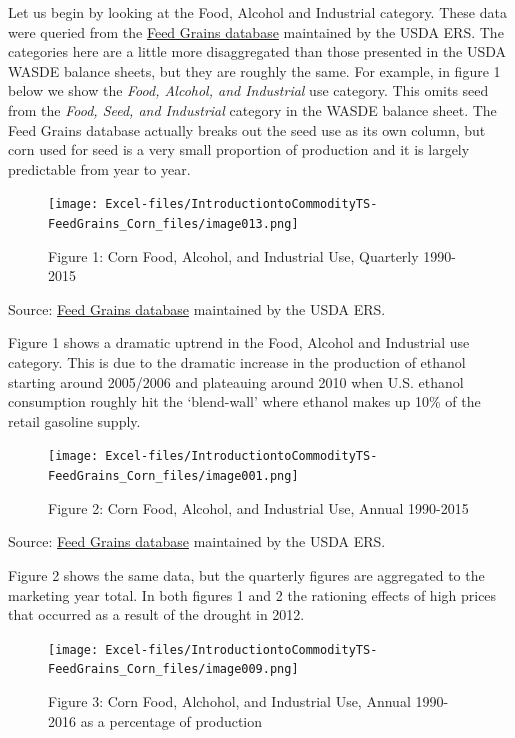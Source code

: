 \documentclass[
]{book}
\begin{document}
Let us begin by looking at the Food, Alcohol and Industrial category. These data were queried from the \href{http://www.ers.usda.gov/data-products/feed-grains-database/feed-grains-yearbook-tables.aspx\#26780}{Feed Grains database} maintained by the USDA ERS. The categories here are a little more disaggregated than those presented in the USDA WASDE balance sheets, but they are roughly the same. For example, in figure 1 below we show the \emph{Food, Alcohol, and Industrial} use category. This omits seed from the \emph{Food, Seed, and Industrial} category in the WASDE balance sheet. The Feed Grains database actually breaks out the seed use as its own column, but corn used for seed is a very small proportion of production and it is largely predictable from year to year.

\begin{figure}
\centering
\texttt{[image: Excel-files/IntroductiontoCommodityTS-FeedGrains\_Corn\_files/image013.png]}
\caption{Figure 1: Corn Food, Alcohol, and Industrial Use, Quarterly 1990-2015}
\end{figure}

Source: \href{http://www.ers.usda.gov/data-products/feed-grains-database/feed-grains-yearbook-tables.aspx\#26780}{Feed Grains database} maintained by the USDA ERS.

Figure 1 shows a dramatic uptrend in the Food, Alcohol and Industrial use category. This is due to the dramatic increase in the production of ethanol starting around 2005/2006 and plateauing around 2010 when U.S. ethanol consumption roughly hit the `blend-wall' where ethanol makes up 10\% of the retail gasoline supply.

\begin{figure}
\centering
\texttt{[image: Excel-files/IntroductiontoCommodityTS-FeedGrains\_Corn\_files/image001.png]}
\caption{Figure 2: Corn Food, Alcohol, and Industrial Use, Annual 1990-2015}
\end{figure}

Source: \href{http://www.ers.usda.gov/data-products/feed-grains-database/feed-grains-yearbook-tables.aspx\#26780}{Feed Grains database} maintained by the USDA ERS.

Figure 2 shows the same data, but the quarterly figures are aggregated to the marketing year total. In both figures 1 and 2 the rationing effects of high prices that occurred as a result of the drought in 2012.

\begin{figure}
\centering
\texttt{[image: Excel-files/IntroductiontoCommodityTS-FeedGrains\_Corn\_files/image009.png]}
\caption{Figure 3: Corn Food, Alchohol, and Industrial Use, Annual 1990-2016 as a percentage of production}
\end{figure}
\end{document}
